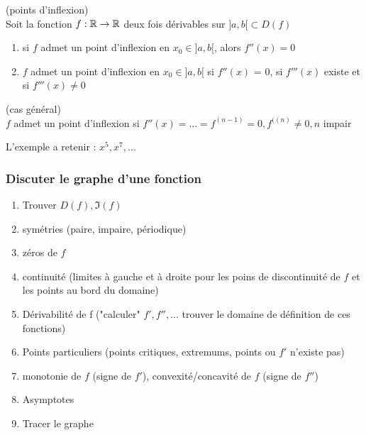 \documentclass[12pt,a4paper]{article}
\begin{document}
{\begin{boite}
	\Theoreme (points d'inflexion)\\
	Soit la fonction $f:\mathbb{R} \to \mathbb{R}$ deux fois dérivables sur $]a,b[ \subset D(f)$
	\begin{enumerate}[label=\roman*)]
		\item si $f$ admet un point d'inflexion en $x_0 \in ]a,b[$, alors $f''(x) = 0$
		\item $f$ admet un point d'inflexion en $x_0 \in ]a,b[$ si $f''(x)$ = 0, si $f'''(x)$ existe et si $f'''(x) \neq 0$
	\end{enumerate}
\end{boite}
\begin{boite}
	 (cas général)\\
	$f$ admet un point d'inflexion si $f''(x) = ... = f^{(n-1)} = 0, f^{((n)}\neq 0, n$ impair
\end{boite}
L'exemple a retenir : $x^5, x^7,..$.

\subsubsection{Discuter le graphe d'une fonction}
\begin{enumerate}
	\item Trouver $D(f), \Im (f)$
	\item symétries (paire, impaire, périodique)
	\item zéros de $f$
	\item continuité (limites à gauche et à droite pour les poins de discontinuité de $f$ et les points au bord du domaine)
	\item Dérivabilité de f ("calculer" $f', f'',...$ trouver le domaine  de définition de ces fonctions)
	\item Points particuliers (points critiques, extremums, points ou $f'$ n'existe pas)
	\item monotonie de $f$ (signe de $f'$), convexité/concavité de $f$ (signe de $f''$)
	\item Asymptotes
	\item Tracer le graphe
\end{enumerate}

}
\end{document}
